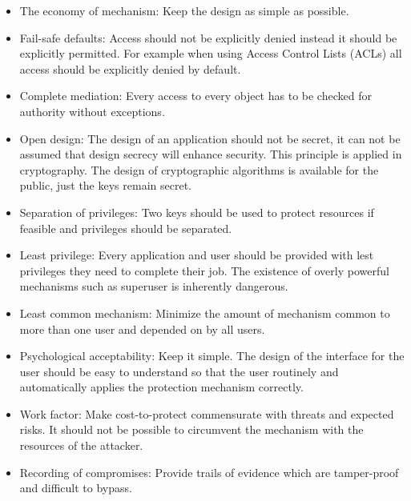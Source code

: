 \begin{itemize}
	\item The economy of mechanism: Keep the design as simple as possible.
	\item Fail-safe defaults: Access should not be explicitly denied instead it should be explicitly permitted. For example when using Access Control Lists (ACLs) all access should be explicitly denied by default. 
	\item Complete mediation: Every access to every object has to be checked for authority without exceptions. 
	\item Open design: The design of an application should not be secret, it can not be assumed that design secrecy will enhance security. This principle is applied in cryptography. The design of cryptographic algorithms is available for the public, just the keys remain secret. 
	\item Separation of privileges: Two keys should be used to protect resources if feasible and privileges should be separated.  
	\item Least privilege: Every application and user should be provided with lest privileges they need to complete their job. The existence of overly powerful mechanisms such as superuser is inherently dangerous. 
	\item Least common mechanism: Minimize the amount of mechanism common to more than one user and depended on by all users.   
	\item Psychological acceptability: Keep it simple. The design of the interface for the user should be easy to understand so that the user routinely and automatically applies the protection mechanism correctly. 
	\item Work factor: Make cost-to-protect commensurate with threats and expected risks. It should not be possible to circumvent the mechanism with the resources of the attacker.   
	\item Recording of compromises: Provide trails of evidence which are tamper-proof and difficult to bypass.
\end{itemize}
	
